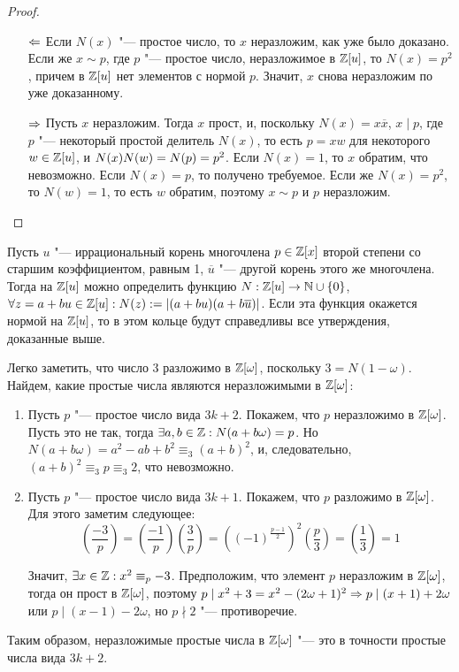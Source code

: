 \begin{proof}~
	\begin{itemize}
		\item[$\Leftarrow$] Если $N(x)$ "--- простое число, то $x$ неразложим, как уже было доказано. Если же $x \sim p$, где $p$ "--- простое число, неразложимое в $\mathbb{Z}[u]$, то $N(x) = p^2$, причем в $\mathbb{Z}[u]$ нет элементов с нормой $p$. Значит, $x$ снова неразложим по уже доказанному.
		\item[$\Rightarrow$] Пусть $x$ неразложим. Тогда $x$ прост, и, поскольку $N(x) = x\overline{x}$, $x \mid p$, где $p$ "--- некоторый простой делитель $N(x)$, то есть $p = xw$ для некоторого $w \in \mathbb{Z}[u]$, и $N(x)N(w) \hm= N(p) = p^2$. Если $N(x) = 1$, то $x$ обратим, что невозможно. Если $N(x) = p$, то получено требуемое. Если же $N(x) = p^2$, то $N(w) = 1$, то есть $w$ обратим, поэтому $x \sim p$ и $p$ неразложим.\qedhere
	\end{itemize}
\end{proof}

\begin{note}
	Пусть $u$ "--- иррациональный корень многочлена $p \in \mathbb{Z}[x]$ второй степени со старшим коэффициентом, равным 1, $\overline{u}$ "--- другой корень этого же многочлена. Тогда на $\mathbb{Z}[u]$ можно определить функцию $N: \mathbb{Z}[u] \to \mathbb{N} \cup \{0\}$, $\forall z = a + bu \in \mathbb{Z}[u]: N(z) := |(a + bu)(a + b\overline{u})|$. Если эта функция окажется нормой на $\mathbb{Z}[u]$, то в этом кольце будут справедливы все утверждения, доказанные выше.
\end{note}

\begin{example}
	Легко заметить, что число 3 разложимо в $\mathbb{Z}[\omega]$, поскольку $3 = N(1 - \omega)$. Найдем, какие простые числа являются неразложимыми в $\mathbb{Z}[\omega]$:
	\begin{enumerate}
		\item Пусть $p$ "--- простое число вида $3k + 2$. Покажем, что $p$ неразложимо в $\mathbb{Z}[\omega]$. Пусть это не так, тогда $\exists a, b \in \mathbb{Z}: N(a + b\omega) = p$. Но $N(a + b\omega) = a^2 - ab + b^2 \equiv_3 (a + b)^2$, и, следовательно, $(a + b)^2 \equiv_3 p \equiv_3 2$, что невозможно.
		\item Пусть $p$ "--- простое число вида $3k + 1$. Покажем, что $p$ разложимо в $\mathbb{Z}[\omega]$. Для этого заметим следующее:
		\[\left(\frac{-3}p\right) = \left(\frac{-1}p\right)\left(\frac{3}p\right) = \left((-1)^{\frac{p-1}2}\right)^2\left(\frac p3\right) = \left(\frac13\right) = 1\]
		
		Значит, $\exists x \in \mathbb{Z}: x^2 \equiv_p -3$. Предположим, что элемент $p$ неразложим в $\mathbb{Z}[\omega]$, тогда он прост в $\mathbb{Z}[\omega]$, поэтому $p \mid x^2 + 3 = x^2 - (2\omega+1)^2 \Rightarrow p \mid (x + 1) + 2\omega$ или $p \mid (x - 1) - 2\omega$, но $p \nmid 2$ "--- противоречие.
	\end{enumerate}
	
	Таким образом, неразложимые простые числа в $\mathbb{Z}[\omega]$ "--- это в точности простые числа вида $3k + 2$.
\end{example}